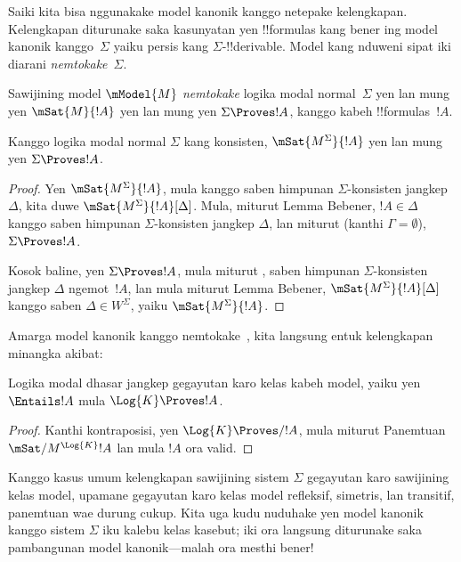 \documentclass[../../../include/open-logic-section]{subfiles}
\begin{document}


Saiki kita bisa nggunakake model kanonik kanggo netepake kelengkapan.
Kelengkapan diturunake saka kasunyatan yen !!{formula}s kang bener ing
model kanonik kanggo~$\Sigma$ yaiku persis kang
$\Sigma$-!!{derivable}. Model kang nduweni sipat iki diarani
\emph{nemtokake}~$\Sigma$.

\begin{defn}
  Sawijining model $\mModel{M}$ \emph{nemtokake} logika modal
  normal~$\Sigma$ yen lan mung yen $\mSat{M}{!A}$ yen lan mung yen
  $\Sigma \Proves !A$, kanggo kabeh !!{formula}s~$!A$.
\end{defn}

\begin{thm}[Panemtuan]
   Kanggo logika modal normal $\Sigma$ kang konsisten,
   $\mSat{M^\Sigma}{!A}$ yen lan mung yen $\Sigma \Proves !A$.
\end{thm}

\begin{proof}
  Yen $\mSat{M^\Sigma}{!A}$, mula kanggo saben himpunan
  $\Sigma$-konsisten jangkep $\Delta$, kita duwe
  $\mSat{M^\Sigma}{!A}[\Delta]$. Mula, miturut Lemma Bebener, $!A \in
  \Delta$ kanggo saben himpunan $\Sigma$-konsisten jangkep $\Delta$, lan
  miturut  (kanthi $\Gamma =
  \emptyset$), $\Sigma \Proves !A$.

  Kosok baline, yen $\Sigma \Proves !A$, mula miturut
  , saben
  himpunan $\Sigma$-konsisten jangkep $\Delta$ ngemot~$!A$, lan mula
  miturut Lemma Bebener, $\mSat{M^\Sigma}{!A}[\Delta]$ kanggo saben
  $\Delta \in W^\Sigma$, yaiku $\mSat{M^\Sigma}{!A}$.
\end{proof}

Amarga model kanonik kanggo  nemtokake~, kita langsung
entuk kelengkapan~ minangka akibat:

\begin{cor}
  Logika modal dhasar  jangkep gegayutan karo kelas kabeh
  model, yaiku yen $\Entails !A$ mula $\Log{K} \Proves !A$.
\end{cor}

\begin{proof}
  Kanthi kontraposisi, yen $\Log{K} \Proves/ !A$, mula miturut Panemtuan
  $\mSat/{M^{\Log{K}}}{!A}$ lan mula $!A$ ora valid.
\end{proof}

Kanggo kasus umum kelengkapan sawijining sistem $\Sigma$ gegayutan
karo sawijining kelas model, upamane  gegayutan karo kelas
model refleksif, simetris, lan transitif, panemtuan wae durung cukup.
Kita uga kudu nuduhake yen model kanonik kanggo sistem $\Sigma$ iku
kalebu kelas kasebut; iki ora langsung diturunake saka pambangunan
model kanonik---malah ora mesthi bener!
\end{document}
